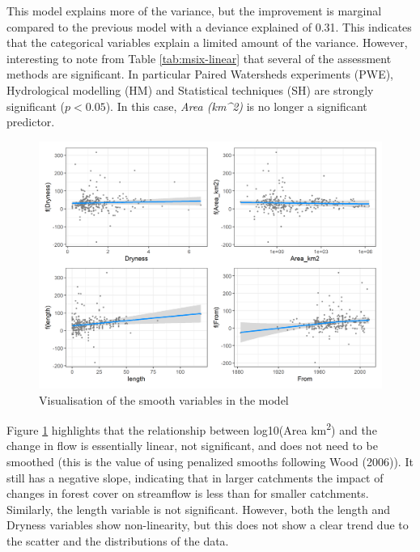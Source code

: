 \documentclass[]{elsarticle} %
\begin{document}
This model explains more of the variance, but the improvement is marginal compared to the previous model with a deviance explained of 0.31. This indicates that the categorical variables explain a limited amount of the variance. However, interesting to note from Table \ref{tab:msix-linear} that several of the assessment methods are significant. In particular Paired Watersheds experiments (PWE), Hydrological modelling (HM) and Statistical techniques (SH) are strongly significant (\(p < 0.05\)).
In this case, \emph{Area (km\^{}2)} is no longer a significant predictor.

\begin{figure}
\includegraphics[width=0.9\linewidth]{model6_smooths} \caption{Visualisation of the smooth variables in the model}\label{fig:smoothsmodel6}
\end{figure}

Figure \ref{fig:smoothsmodel6} highlights that the relationship between log10(Area km\textsuperscript{2}) and the change in flow is essentially linear, not significant, and does not need to be smoothed (this is the value of using penalized smooths following Wood (2006)). It still has a negative slope, indicating that in larger catchments the impact of changes in forest cover on streamflow is less than for smaller catchments. Similarly, the length variable is not significant. However, both the length and Dryness variables show non-linearity, but this does not show a clear trend due to the scatter and the distributions of the data.
\end{document}
